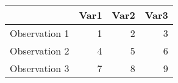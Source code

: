 \begin{tabular}{ r r r r }
	  & Var1 & Var2 & Var3 \\
	\hline
	 Observation 1 & 1 & 2 & 3 \\
	 Observation 2 & 4 & 5 & 6 \\
	 Observation 3 & 7 & 8 & 9 \\
\end{tabular}